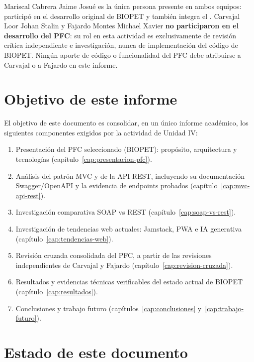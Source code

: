 Mariscal Cabrera Jaime Josu\'e es la \'unica persona presente en ambos
equipos: particip\'o en el desarrollo original de BIOPET y tambi\'en
integra el \equipoga. Carvajal Loor Johan Stalin y Fajardo Montes Michael
Xavier \textbf{no participaron en el desarrollo del PFC}: su rol en esta
actividad es exclusivamente de revisi\'on cr\'itica independiente e
investigaci\'on, nunca de implementaci\'on del c\'odigo de BIOPET. Ning\'un
aporte de c\'odigo o funcionalidad del PFC debe atribuirse a Carvajal o a
Fajardo en este informe.

\section{Objetivo de este informe}
\label{sec:objetivo-informe}

El objetivo de este documento es consolidar, en un \'unico informe
acad\'emico, los siguientes componentes exigidos por la actividad de
Unidad IV:

\begin{enumerate}[nosep]
  \item Presentaci\'on del PFC seleccionado (BIOPET): prop\'osito,
    arquitectura y tecnolog\'ias (cap\'itulo~\ref{cap:presentacion-pfc}).
  \item An\'alisis del patr\'on MVC y de la API REST, incluyendo su
    documentaci\'on Swagger/OpenAPI y la evidencia de endpoints probados
    (cap\'itulo~\ref{cap:mvc-api-rest}).
  \item Investigaci\'on comparativa SOAP vs REST
    (cap\'itulo~\ref{cap:soap-vs-rest}).
  \item Investigaci\'on de tendencias web actuales: Jamstack, PWA e IA
    generativa (cap\'itulo~\ref{cap:tendencias-web}).
  \item Revisi\'on cruzada consolidada del PFC, a partir de las revisiones
    independientes de Carvajal y Fajardo
    (cap\'itulo~\ref{cap:revision-cruzada}).
  \item Resultados y evidencias t\'ecnicas verificables del estado actual
    de BIOPET (cap\'itulo~\ref{cap:resultados}).
  \item Conclusiones y trabajo futuro
    (cap\'itulos~\ref{cap:conclusiones} y~\ref{cap:trabajo-futuro}).
\end{enumerate}

\section{Estado de este documento}
\label{sec:estado-documento}

